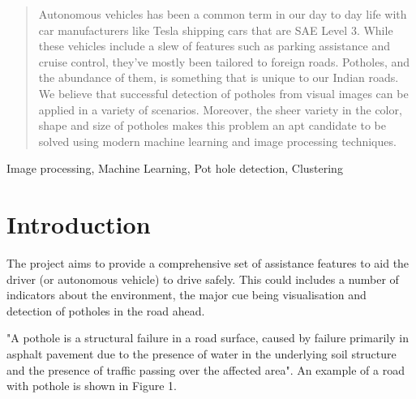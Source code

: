 \documentclass[journal]{IEEEtran}
\begin{document}

\maketitle

\begin{abstract}
Autonomous vehicles has been a common term in our day to day life with
car manufacturers like Tesla shipping cars that are SAE Level 3. While
these vehicles include a slew of features such as parking assistance and cruise
control, they’ve mostly been tailored to foreign roads. Potholes, and the
abundance of them, is something that is unique to our Indian roads. We
believe that successful detection of potholes from visual images can be applied
in a variety of scenarios. Moreover, the sheer variety in the color, shape and
size of potholes makes this problem an apt candidate to be solved using
modern machine learning and image processing techniques.
\end{abstract}

\begin{IEEEkeywords}
Image processing, Machine Learning, Pot hole detection, Clustering
\end{IEEEkeywords}

\IEEEpeerreviewmaketitle



\section{Introduction}
The project aims to provide a comprehensive set of assistance features to aid the driver (or autonomous vehicle) to drive safely. This could includes a number of indicators about the environment, the major cue being visualisation and detection of potholes in the road ahead. 

"A pothole \cite{pothole} is a structural failure in a road surface, caused by failure primarily in asphalt pavement due to the presence of water in the underlying soil structure and the presence of traffic passing over the affected area". An example of a road with pothole is shown in Figure 1.
\end{document}
